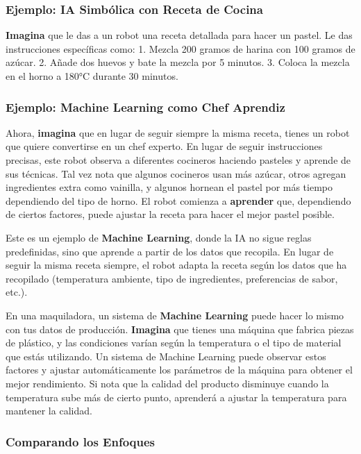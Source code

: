 \documentclass[
  10pt,
  letterpaper,
]{book}
\begin{document}
\subsubsection{Ejemplo: IA Simbólica con Receta de
Cocina}\label{ejemplo-ia-simbuxf3lica-con-receta-de-cocina}

\textbf{Imagina} que le das a un robot una receta detallada para hacer
un pastel. Le das instrucciones específicas como: 1. Mezcla 200 gramos
de harina con 100 gramos de azúcar. 2. Añade dos huevos y bate la mezcla
por 5 minutos. 3. Coloca la mezcla en el horno a 180°C durante 30
minutos.

\subsubsection{Ejemplo: Machine Learning como Chef
Aprendiz}\label{ejemplo-machine-learning-como-chef-aprendiz}

Ahora, \textbf{imagina} que en lugar de seguir siempre la misma receta,
tienes un robot que quiere convertirse en un chef experto. En lugar de
seguir instrucciones precisas, este robot observa a diferentes cocineros
haciendo pasteles y aprende de sus técnicas. Tal vez nota que algunos
cocineros usan más azúcar, otros agregan ingredientes extra como
vainilla, y algunos hornean el pastel por más tiempo dependiendo del
tipo de horno. El robot comienza a \textbf{aprender} que, dependiendo de
ciertos factores, puede ajustar la receta para hacer el mejor pastel
posible.

Este es un ejemplo de \textbf{Machine Learning}, donde la IA no sigue
reglas predefinidas, sino que aprende a partir de los datos que
recopila. En lugar de seguir la misma receta siempre, el robot adapta la
receta según los datos que ha recopilado (temperatura ambiente, tipo de
ingredientes, preferencias de sabor, etc.).

En una maquiladora, un sistema de \textbf{Machine Learning} puede hacer
lo mismo con tus datos de producción. \textbf{Imagina} que tienes una
máquina que fabrica piezas de plástico, y las condiciones varían según
la temperatura o el tipo de material que estás utilizando. Un sistema de
Machine Learning puede observar estos factores y ajustar automáticamente
los parámetros de la máquina para obtener el mejor rendimiento. Si nota
que la calidad del producto disminuye cuando la temperatura sube más de
cierto punto, aprenderá a ajustar la temperatura para mantener la
calidad.

\subsubsection{Comparando los Enfoques}\label{comparando-los-enfoques}
\end{document}
